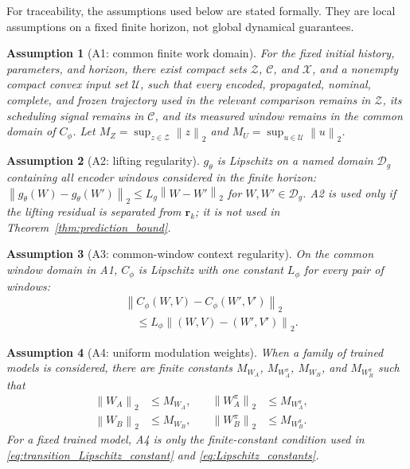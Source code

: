 ﻿\documentclass[journal]{IEEEtran}
\newtheorem{assumption}{Assumption}
\newcommand{\vr}{\mathbf{r}}
\newcommand{\norm}[1]{\left\lVert #1\right\rVert}
\begin{document}
For traceability, the assumptions used below are stated formally. They are local assumptions on a fixed finite horizon, not global dynamical guarantees.
\begin{assumption}[A1: common finite work domain]
\label{ass:a1}
For the fixed initial history, parameters, and horizon, there exist compact sets $\mathcal Z$, $\mathcal C$, and $\mathcal X$, and a nonempty compact convex input set $\mathcal U$, such that every encoded, propagated, nominal, complete, and frozen trajectory used in the relevant comparison remains in $\mathcal Z$, its scheduling signal remains in $\mathcal C$, and its measured window remains in the common domain of $C_\phi$. Let $M_Z=\sup_{z\in\mathcal Z}\norm{z}_2$ and $M_U=\sup_{u\in\mathcal U}\norm{u}_2$.
\end{assumption}
\begin{assumption}[A2: lifting regularity]
\label{ass:a2}
$g_\theta$ is Lipschitz on a named domain $\mathcal D_g$ containing all encoder windows considered in the finite horizon: $\norm{g_\theta(W)-g_\theta(W')}_2\le L_g\norm{W-W'}_2$ for $W,W'\in\mathcal D_g$. A2 is used only if the lifting residual is separated from $\vr_k$; it is not used in Theorem~\ref{thm:prediction_bound}.
\end{assumption}
\begin{assumption}[A3: common-window context regularity]
\label{ass:a3}
On the common window domain in A1, $C_\phi$ is Lipschitz with one constant $L_\phi$ for every pair of windows:
\begin{equation}
\begin{aligned}
&\norm{C_\phi(W,V)-C_\phi(W',V')}_2\\
&\quad\le L_\phi\norm{(W,V)-(W',V')}_2.
\end{aligned}
\end{equation}
\end{assumption}
\begin{assumption}[A4: uniform modulation weights]
\label{ass:a4}
When a family of trained models is considered, there are finite constants $M_{W_A}$, $M_{W_A^\pi}$, $M_{W_B}$, and $M_{W_B^\pi}$ such that
\begin{equation}
\begin{aligned}
\norm{W_A}_2&\le M_{W_A},\quad &\norm{W_A^\pi}_2&\le M_{W_A^\pi},\quad\\
\norm{W_B}_2&\le M_{W_B},\quad &\norm{W_B^\pi}_2&\le M_{W_B^\pi}.
\end{aligned}
\end{equation}
For a fixed trained model, A4 is only the finite-constant condition used in \eqref{eq:transition_Lipschitz_constant} and \eqref{eq:Lipschitz_constants}.
\end{assumption}
\end{document}
